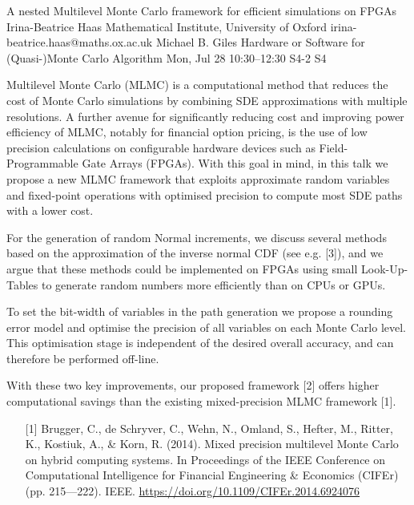 \begin{talk}
  {A nested Multilevel Monte Carlo framework for efficient simulations on FPGAs}%
  {Irina-Beatrice Haas}%
  {Mathematical Institute, University of Oxford}%
  {irina-beatrice.haas@maths.ox.ac.uk}%
  {Michael B. Giles}%
  {Hardware or Software for (Quasi-)Monte Carlo Algorithm}%
  {Mon, Jul 28 10:30–12:30}%
  {S4-2}%
  {S4}%
				
			

Multilevel Monte Carlo (MLMC) is a computational method that reduces the cost of Monte Carlo simulations by combining SDE approximations with multiple resolutions. A further avenue for significantly reducing cost and improving power efficiency of MLMC, notably for financial option pricing, is the use of low precision calculations on configurable hardware devices such as Field-Programmable Gate Arrays (FPGAs). With this goal in mind, in this talk we propose a new MLMC framework that exploits approximate random variables and fixed-point operations with optimised precision to compute most SDE paths with a lower cost.

For the generation of random Normal increments, we discuss several methods based on the approximation of the inverse normal CDF (see e.g. [3]), and we argue that these methods could be implemented on FPGAs using small Look-Up-Tables to generate random numbers more efficiently than on CPUs or GPUs. 

To set the bit-width of variables in the path generation we propose a rounding error model and optimise the precision of all variables on each Monte Carlo level. This optimisation stage is independent of the desired overall accuracy, and can therefore be performed off-line. 

With these two key improvements, our proposed framework [2] offers higher computational
savings than the existing mixed-precision MLMC framework [1].


\medskip


\begin{enumerate}

    \item[{[1]}] Brugger, C., de Schryver, C., Wehn, N., Omland, S., Hefter, M., Ritter, K., Kostiuk, A., \& Korn, R. (2014). Mixed precision multilevel Monte Carlo on hybrid computing systems. In Proceedings of the IEEE Conference on Computational Intelligence for Financial Engineering \& Economics (CIFEr) (pp. 215---222). IEEE. \url{https://doi.org/10.1109/CIFEr.2014.6924076}
    

\end{enumerate}
\end{talk}
